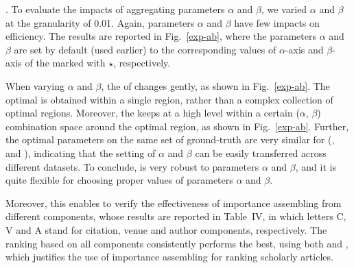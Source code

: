 .
To evaluate the impacts of aggregating parameters $\alpha$ and $\beta$, we varied $\alpha$ and $\beta$ at the granularity of 0.01. Again, parameters $\alpha$ and $\beta$ have few impacts on efficiency. The results are reported in Fig.~\ref{exp-ab}, where the parameters $\alpha$ and $\beta$ are set by default (used earlier) to the corresponding values of $\alpha$-axis and $\beta$-axis of the \PairAcc marked with $\star$, respectively.

When varying $\alpha$ and $\beta$, the \PairAcc of \ensemblerank changes gently, as shown in Fig.~\ref{exp-ab}.
The optimal \PairAcc is obtained within a single region, rather than a complex collection of optimal regions.
%
Moreover, the \PairAcc keeps at a high level within a certain ($\alpha$, $\beta$) combination space around the optimal region, as shown in Fig.~\ref{exp-ab}.
%
Further, the optimal parameters on the same set of ground-truth are very similar for (\aan, \aminer and \magdata), indicating that the setting of $\alpha$ and $\beta$ can be easily transferred across different datasets.
To conclude, \ensemblerank is very robust to parameters $\alpha$ and $\beta$, and it is quite flexible for choosing proper values of parameters $\alpha$ and $\beta$.

Moreover, this enables to verify the effectiveness of importance assembling from different components, whose results are reported in Table~IV, in which letters C, V and A stand for citation, venue and author components, respectively.
The ranking based on all components consistently performs the best, using both \recom and \fcita, which justifies the use of importance assembling for ranking scholarly articles.


